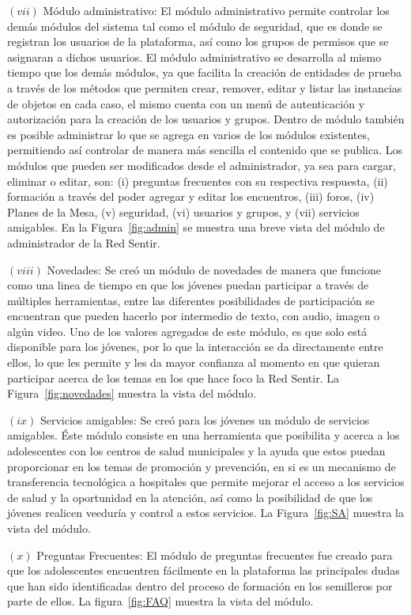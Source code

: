 \documentclass[journal,transmag]{IEEEtran}
\begin{document}
$(vii)$ Módulo administrativo: El módulo administrativo permite controlar los demás módulos del sistema tal como el módulo de seguridad, que es donde se registran los usuarios de la plataforma, así como los grupos de permisos que se asignaran a dichos usuarios. El módulo administrativo se desarrolla al mismo tiempo que los demás módulos, ya que facilita la creación de entidades de prueba a través de los métodos que permiten crear, remover, editar y listar  las instancias de objetos en cada caso, el mismo cuenta con un menú de autenticación y autorización para la creación de los usuarios y grupos. Dentro de módulo también es posible administrar lo que se agrega en varios de los módulos existentes, permitiendo así controlar de manera más sencilla el contenido que se publica. Los módulos que pueden ser modificados desde el administrador, ya sea para cargar, eliminar o editar, son: (i) preguntas frecuentes con su respectiva respuesta, (ii) formación a través del poder agregar y editar los encuentros, (iii) foros, (iv) Planes de la Mesa, (v) seguridad, (vi) usuarios y grupos, y (vii) servicios amigables. En la Figura~\ref{fig:admin} se muestra una breve vista del módulo de administrador de la Red Sentir.

$(viii)$ Novedades: Se creó un módulo de novedades de manera que funcione como una linea de tiempo en que los jóvenes puedan participar a través de múltiples herramientas, entre las diferentes posibilidades de participación se encuentran que pueden hacerlo por intermedio de texto, con audio, imagen o algún video. Uno de los valores agregados de este módulo, es que solo está disponible para los jóvenes, por lo que la interacción se da directamente entre ellos, lo que les permite y les da mayor confianza al momento en que quieran participar acerca de los temas en los que hace foco la Red Sentir. La Figura~\ref{fig:novedades} muestra la vista del módulo.

$(ix)$ Servicios amigables: Se creó para los jóvenes un módulo de servicios amigables. Éste módulo 
consiste en una herramienta que posibilita y acerca a los adolescentes con los centros de salud municipales y la ayuda que estos puedan proporcionar en los temas de promoción y prevención, en si es un mecanismo de transferencia tecnológica a hospitales que permite mejorar el acceso a los servicios de salud y la oportunidad en la atención, así como la posibilidad de que los jóvenes realicen veeduría y control a estos servicios. La Figura~\ref{fig:SA} muestra la vista del módulo. 

$(x)$ Preguntas Frecuentes: El módulo de preguntas frecuentes fue creado para que los adolescentes encuentren fácilmente en la plataforma las principales dudas que han sido identificadas dentro del proceso de formación en los semilleros por parte de ellos. La figura~\ref{fig:FAQ} muestra la vista del módulo.
\end{document}
